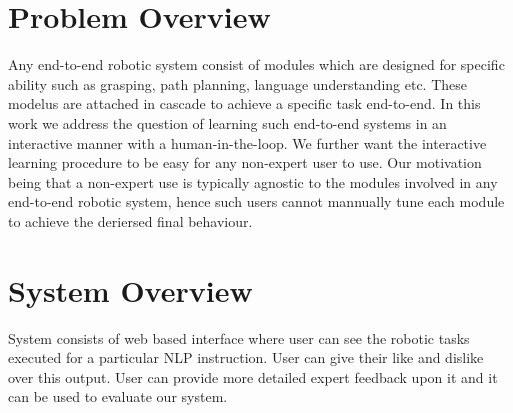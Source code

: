 \section{Problem Overview}

Any end-to-end robotic system consist of modules which are designed for specific
ability such as grasping, path planning, language understanding etc. These
modelus are attached in cascade to achieve a specific task end-to-end. In this
work we address the question of learning such end-to-end systems in an
interactive manner with a human-in-the-loop. We further want the interactive
learning procedure to be easy for any non-expert user to use. Our motivation
being that a non-expert use is typically agnostic to the modules involved in any
end-to-end robotic system, hence such users cannot mannually tune each module to
achieve the deriersed final behaviour.    

\section{System Overview}



System consists of web based interface where user can see the robotic tasks
executed for a particular NLP instruction. User can give their like and dislike
over this output. User can provide more detailed expert feedback upon it and it
can be used to evaluate our system. 



